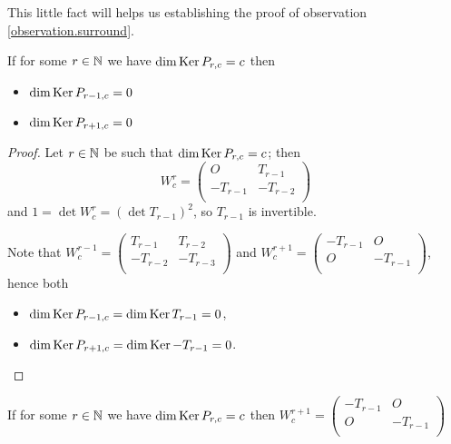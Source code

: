 This little fact will helps us establishing the proof of observation
\ref{observation.surround}.

\begin{theorem}
  If for some $r\in\mathbb{N}$ we have $\dim\operatorname{Ker} P_{r,c} = c$ then
  \begin{itemize}
    \item $\dim\operatorname{Ker} P_{r-1,c} = 0$
    \item $\dim\operatorname{Ker} P_{r+1,c} = 0$
  \end{itemize}
\end{theorem}

\begin{proof}
  Let $r\in\mathbb{N}$ be such that $\dim\operatorname{Ker} P_{r,c} = c$; then
  \[
  W_{c}^{r}
  =
  \left(
  \begin{array}{cc}
     O    &  T_{r-1}  \\
    -T_{r-1} & -T_{r-2} \\
  \end{array}
  \right)
  \]
  and $1 = \det W_{c}^{r} = (\det T_{r-1})^{2}$, so $T_{r-1}$ is
  invertible.

  Note that
  $W_{c}^{r-1} = \left(\begin{smallmatrix} T_{r-1} & T_{r-2} \\-T_{r-2} & -T_{r-3} \\\end{smallmatrix}\right)$
  and
  $W_{c}^{r+1} = \left(\begin{smallmatrix} -T_{r-1} & O \\ O & -T_{r-1} \\\end{smallmatrix}\right)$,
  hence both
  \begin{itemize}
    \item $\dim\operatorname{Ker} P_{r-1,c} = \dim\operatorname{Ker} T_{r-1} = 0$,
    \item $\dim\operatorname{Ker} P_{r+1,c} = \dim\operatorname{Ker} -T_{r-1} = 0$.
  \end{itemize}
\end{proof}

\begin{corollary}\label{block-diagonal}
  If for some $r\in\mathbb{N}$ we have $\dim\operatorname{Ker} P_{r,c} = c$ then
  $W_{c}^{r+1} = \left(\begin{smallmatrix} -T_{r-1} & O \\ O & -T_{r-1} \\\end{smallmatrix}\right)$
\end{corollary}

